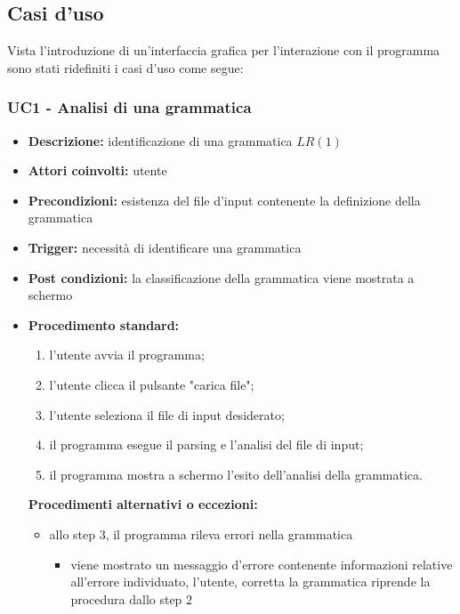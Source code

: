 \documentclass[12pt]{article}
\begin{document}
\pagebreak
\subsection{Casi d'uso}
Vista l'introduzione di un'interfaccia grafica per l'interazione con il programma sono stati ridefiniti i casi d'uso come segue:
\subsubsection{UC1 - Analisi di una grammatica}
\begin{itemize}[label=]
\item \textbf{Descrizione:} identificazione di una grammatica $LR\left( 1 \right)$
\item \textbf{Attori coinvolti:} utente
\item \textbf{Precondizioni:} esistenza del file d'input contenente la definizione della grammatica
\item \textbf{Trigger:} necessità di identificare una grammatica
\item \textbf{Post condizioni:} la classificazione della grammatica viene mostrata a schermo
\item \textbf{Procedimento standard:}
\begin{enumerate}[label=\arabic*.]
\item l'utente avvia il programma;
\item l'utente clicca il pulsante "carica file";
\item l'utente seleziona il file di input desiderato;
\item il programma esegue il parsing e l'analisi del file di input;
\item il programma mostra a schermo l'esito dell'analisi della grammatica.
\end{enumerate}
\textbf{Procedimenti alternativi o eccezioni:}
\begin{itemize}
\item allo step $3$, il programma rileva errori nella grammatica
\begin{itemize}[label=]
\item viene mostrato un messaggio d'errore contenente informazioni relative all'errore individuato, l'utente, corretta la grammatica riprende la procedura dallo step $2$
\end{itemize}
\end{itemize}
\end{itemize}
\end{document}
